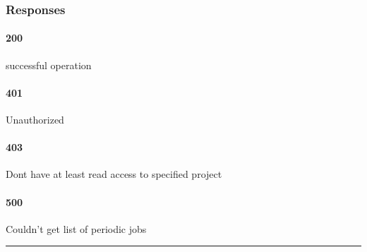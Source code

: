 \hypertarget{responses-16}{%
\subsubsection*{Responses}\label{responses-16}}

\hypertarget{section-55}{%
\paragraph{200}\label{section-55}}

successful operation

\hypertarget{section-56}{%
\paragraph{401}\label{section-56}}

Unauthorized \protect\hyperlink{}{}

\hypertarget{section-57}{%
\paragraph{403}\label{section-57}}

Dont have at least read access to specified project
\protect\hyperlink{}{}

\hypertarget{section-58}{%
\paragraph{500}\label{section-58}}

Couldn't get list of periodic jobs \protect\hyperlink{}{}

\begin{center}\rule{0.5\linewidth}{0.5pt}\end{center}
